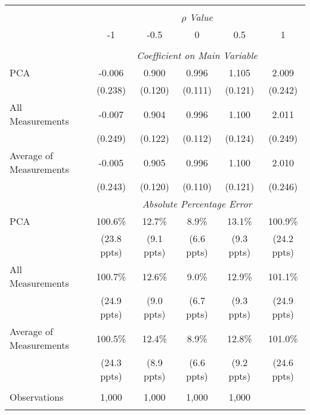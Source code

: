 \begin{table}[!htbp] \centering
\begin{tabular}{@{\extracolsep{5pt}}lccccc}
\\[-1.8ex]\hline
\hline \\[-1.8ex]
& \multicolumn{5}{c}{$\rho$ \textit{ Value}} \
\cr \cline{5-6}
\\[-1.8ex] & -1 & -0.5 & 0 & 0.5 & 1 \\
\hline \\[-1.8ex]
& \multicolumn{5}{c}{\textit{Coefficient on Main Variable}} \\
 PCA & -0.006 & 0.900 & 0.996 & 1.105 & 2.009  \\
  & (0.238) & (0.120) & (0.111) & (0.121) & (0.242)\\
 All Measurements & -0.007 & 0.904 & 0.996 & 1.100 & 2.011  \\
  & (0.249) & (0.122) & (0.112) & (0.124) & (0.249)\\
 Average of Measurements & -0.005 & 0.905 & 0.996 & 1.100 & 2.010  \\
  & (0.243) & (0.120) & (0.110) & (0.121) & (0.246)\\
& \multicolumn{5}{c}{\textit{Absolute Percentage Error}} \\
  PCA & 100.6\% & 12.7\% & 8.9\% & 13.1\% & 100.9\% \\
   & (23.8 ppts) & (9.1 ppts) & (6.6 ppts) & (9.3 ppts) & (24.2 ppts)\\
All Measurements & 100.7\% & 12.6\% & 9.0\% & 12.9\% & 101.1\%  \\
  & (24.9 ppts) & (9.0 ppts) & (6.7 ppts) & (9.3 ppts) & (24.9 ppts)\\
  Average of Measurements & 100.5\% & 12.4\% & 8.9\% & 12.8\% & 101.0\% \\
  & (24.3 ppts) & (8.9 ppts) & (6.6 ppts) & (9.2 ppts) & (24.6 ppts)\\
  \hline \\[-1.8ex]
 Observations & 1,000 & 1,000 & 1,000 & 1,000 &\\
\hline
\hline \\[-1.8ex]
\end{tabular}
\end{table}